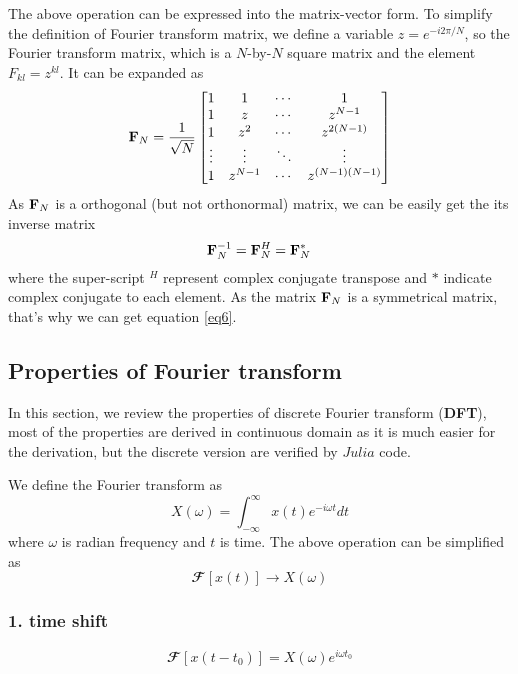 \documentclass[revised,endfloat]{geophysics}
\begin{document}
The above operation can be expressed into the matrix-vector form. To simplify the definition of Fourier transform matrix, we define a variable $z = e^{-i 2\pi  / N}$, so the Fourier transform matrix, which is a $N$-by-$N$ square matrix and the element $F_{kl} = z^{kl}$. It can be expanded as
\begin{equation}
{\bf F}_N = \frac{1}{\sqrt{N}}\begin{bmatrix}
1 & 1 & \cdots & 1 \\
1 & z & \cdots & z^{N-1} \\
1 & z^2 & \cdots & z^{2(N-1)} \\
\vdots & \vdots & \ddots & \vdots \\
1 & z^{N-1} & \cdots & z^{(N-1)(N-1)} \\
\end{bmatrix}
\label{eq5}
\end{equation}
As ${\bf F}_N$ is a orthogonal (but not orthonormal) matrix, we can be easily get the its inverse matrix
\begin{equation}
{\bf F}_N^{-1} = {\bf F}_N^H =  {\bf F}_N^{\ast} \,
\label{eq6}
\end{equation}
where the super-script $^H$ represent complex conjugate transpose and $\ast$ indicate complex conjugate to each element. As the matrix ${\bf F}_N$ is a symmetrical matrix, that's why we can get equation \ref{eq6}.

\subsection{Properties of Fourier transform}

In this section, we review the properties of discrete Fourier transform ({\bf DFT}), most of the properties are derived in continuous domain as it is much easier for the derivation, but the discrete version are verified by $Julia$ code.

We define the Fourier transform as
\begin{equation}
X(\omega) = \int_{-\infty}^{\infty} x(t) e^{-i\omega t} dt
\end{equation}
where $\omega$ is radian frequency and $t$ is time. The above operation can be simplified as 
\begin{equation}
{\mathbfcal F}[x(t)] \rightarrow X(\omega)
\end{equation}

\subsubsection{1. time shift}
\begin{equation}
{\mathbfcal F}[x(t-t_0)] = X(\omega)e^{i \omega t_0}
\end{equation}
\end{document}
